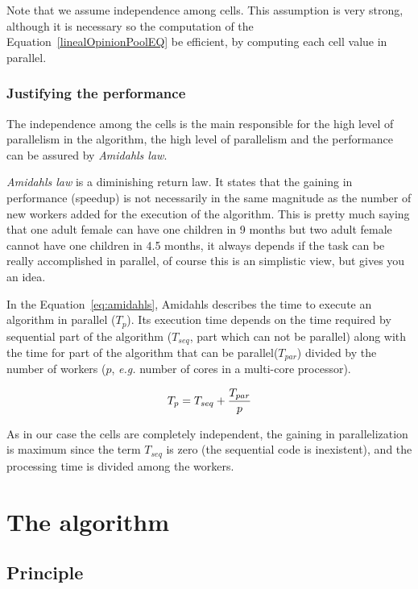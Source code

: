 Note that we assume independence among cells. This assumption is very strong, although it is necessary so the computation of the Equation~\eqref{linealOpinionPoolEQ} be efficient, by computing each cell value in parallel. %

\subsubsection{Justifying the performance}

The independence among the cells is the main responsible for the high level of parallelism in the algorithm, the high level of parallelism and the performance can be assured by \textit{Amidahls law}.

\textit{Amidahls law} is a diminishing return law. It states that the gaining in performance (speedup) is not necessarily in the same magnitude as the number of new workers added for the execution of the algorithm\cite{Amdahl:1967:VSP:1465482.1465560}. This is pretty much saying that one adult female can have one children in 9 months but two adult female cannot have one children in 4.5 months, it always depends if the task can be really accomplished in parallel, of course this is an simplistic view, but gives you an idea.

In the Equation~\ref{eq:amidahls}, Amidahls describes the time to execute an algorithm in parallel ($T_p$). Its execution time depends on the time required by sequential part of the algorithm ($T_{seq}$, part which can not be parallel) along with the time for part of the algorithm that can be parallel($T_{par}$) divided by the number of workers ($p$, \textit{e.g.} number of cores in a multi-core processor).

\begin{equation}
\label{eq:amidahls}
T_p=T_{seq}+{T_{par} \over p}
\end{equation}

As in our case the cells are completely independent, the gaining in parallelization is maximum since the term $T_{seq}$ is zero (the sequential code is inexistent), and the processing time is divided among the workers.

\section{The algorithm}

\subsection{Principle} 

